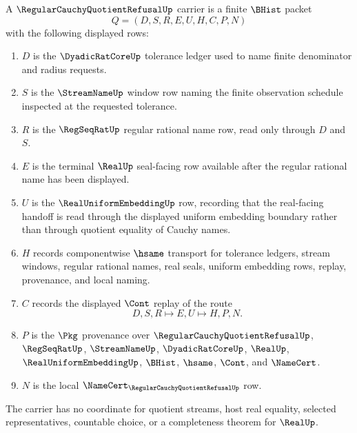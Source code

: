 \begin{definition}
\label{def:regular-cauchy-quotient-refusal-carrier}
A $\RegularCauchyQuotientRefusalUp$ carrier is a finite $\BHist$ packet
$$
Q=(D,S,R,E,U,H,C,P,N)
$$
with the following displayed rows:
\begin{enumerate}
\item $D$ is the $\DyadicRatCoreUp$ tolerance ledger used to name finite denominator and radius requests.
\item $S$ is the $\StreamNameUp$ window row naming the finite observation schedule inspected at the requested tolerance.
\item $R$ is the $\RegSeqRatUp$ regular rational name row, read only through $D$ and $S$.
\item $E$ is the terminal $\RealUp$ seal-facing row available after the regular rational name has been displayed.
\item $U$ is the $\RealUniformEmbeddingUp$ row, recording that the real-facing handoff is read through the displayed uniform embedding boundary rather than through quotient equality of Cauchy names.
\item $H$ records componentwise $\hsame$ transport for tolerance ledgers, stream windows, regular rational names, real seals, uniform embedding rows, replay, provenance, and local naming.
\item $C$ records the displayed $\Cont$ replay of the route
$$
D,S,R \longmapsto E,U \longmapsto H,P,N .
$$
\item $P$ is the $\Pkg$ provenance over $\RegularCauchyQuotientRefusalUp$, $\RegSeqRatUp$, $\StreamNameUp$, $\DyadicRatCoreUp$, $\RealUp$, $\RealUniformEmbeddingUp$, $\BHist$, $\hsame$, $\Cont$, and $\NameCert$.
\item $N$ is the local $\NameCert_{\RegularCauchyQuotientRefusalUp}$ row.
\end{enumerate}
The carrier has no coordinate for quotient streams, host real equality, selected representatives, countable choice, or a completeness theorem for $\RealUp$.
\end{definition}

